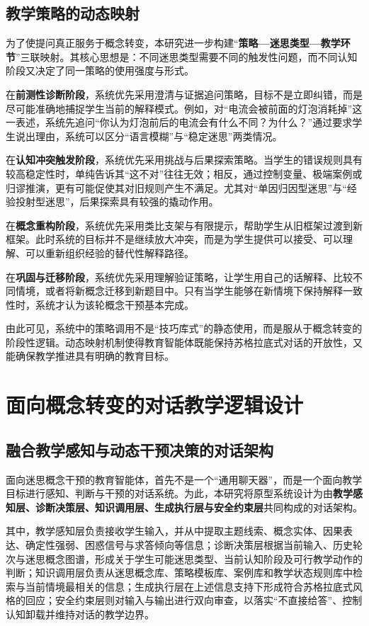 \subsection{教学策略的动态映射}
\label{sec:4.2.3}

为了使提问真正服务于概念转变，本研究进一步构建“\textbf{策略—迷思类型—教学环节}”三联映射。其核心思想是：不同迷思类型需要不同的触发性问题，而不同认知阶段又决定了同一策略的使用强度与形式。

在\textbf{前测性诊断阶段}，系统优先采用澄清与证据追问策略，目标不是立即纠错，而是尽可能准确地捕捉学生当前的解释模式。例如，对“电流会被前面的灯泡消耗掉”这一表述，系统先追问“你认为灯泡前后的电流会有什么不同？为什么？”通过要求学生说出理由，系统可以区分“语言模糊”与“稳定迷思”两类情况。

在\textbf{认知冲突触发阶段}，系统优先采用挑战与后果探索策略。当学生的错误规则具有较高稳定性时，单纯告诉其“这不对”往往无效；相反，通过控制变量、极端案例或归谬推演，更有可能促使其对旧规则产生不满足。尤其对“单因归因型迷思”与“经验投射型迷思”，后果探索具有较强的撬动作用。

在\textbf{概念重构阶段}，系统优先采用类比支架与有限提示，帮助学生从旧框架过渡到新框架。此时系统的目标并不是继续放大冲突，而是为学生提供可以接受、可以理解、可以重新组织经验的替代性解释路径。

在\textbf{巩固与迁移阶段}，系统优先采用理解验证策略，让学生用自己的话解释、比较不同情境，或者将新概念迁移到新题目中。只有当学生能够在新情境下保持解释一致性时，系统才认为该轮概念干预基本完成。

由此可见，系统中的策略调用不是“技巧库式”的静态使用，而是服从于概念转变的阶段性逻辑。动态映射机制使得教育智能体既能保持苏格拉底式对话的开放性，又能确保教学推进具有明确的教育目标。

\section{面向概念转变的对话教学逻辑设计}
\label{sec:4.3}

\subsection{融合教学感知与动态干预决策的对话架构}
\label{sec:4.3.1}

面向迷思概念干预的教育智能体，首先不是一个“通用聊天器”，而是一个面向教学目标进行感知、判断与干预的对话系统。为此，本研究将原型系统设计为由\textbf{教学感知层、诊断决策层、知识调用层、生成执行层与安全约束层}共同构成的对话架构。

其中，教学感知层负责接收学生输入，并从中提取主题线索、概念实体、因果表达、确定性强弱、困惑信号与求答倾向等信息；诊断决策层根据当前输入、历史轮次与迷思概念图谱，形成关于学生可能迷思类型、当前认知阶段及可行教学动作的判断；知识调用层负责从迷思概念库、策略模板库、案例库和教学状态规则库中检索与当前情境最相关的信息；生成执行层在上述信息支持下形成符合苏格拉底式风格的回应；安全约束层则对输入与输出进行双向审查，以落实“不直接给答”、控制认知卸载并维持对话的教学边界。

